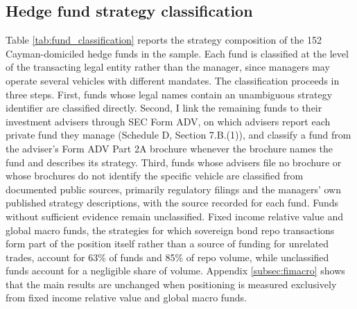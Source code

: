 \documentclass[english, 11pt, oneside]{article}
\begin{document}
\clearpage
\subsection{Hedge fund strategy classification}
\label{subsec:classification}

Table \ref{tab:fund_classification} reports the strategy composition of the 152 Cayman-domiciled hedge funds in the sample. Each fund is classified at the level of the transacting legal entity rather than the manager, since managers may operate several vehicles with different mandates. The classification proceeds in three steps. First, funds whose legal names contain an unambiguous strategy identifier are classified directly. Second, I link the remaining funds to their investment advisers through SEC Form ADV, on which advisers report each private fund they manage (Schedule D, Section 7.B.(1)), and classify a fund from the adviser's Form ADV Part 2A brochure whenever the brochure names the fund and describes its strategy. Third, funds whose advisers file no brochure or whose brochures do not identify the specific vehicle are classified from documented public sources, primarily regulatory filings and the managers' own published strategy descriptions, with the source recorded for each fund. Funds without sufficient evidence remain unclassified. Fixed income relative value and global macro funds, the strategies for which sovereign bond repo transactions form part of the position itself rather than a source of funding for unrelated trades, account for 63\% of funds and 85\% of repo volume, while unclassified funds account for a negligible share of volume. Appendix \ref{subsec:fimacro} shows that the main results are unchanged when positioning is measured exclusively from fixed income relative value and global macro funds. \\
\end{document}
